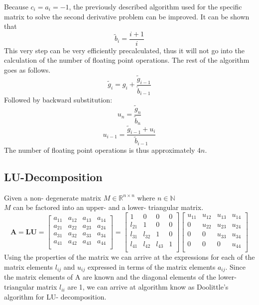 \documentclass[10pt,a4paper]{article}
\begin{document}
Because $c_i=a_i=-1$, the previously described algorithm used for the specific matrix  to solve the second derivative problem can be improved. It can be shown that 
$$\tilde{b}_i=\frac{i+1}{i}$$
This very step can be very efficiently precalculated, thus it will not go into the calculation of the number of floating point operations. The rest of the algorithm goes as follows.
$$\tilde{g}_i=g_i+\frac{\tilde{g}_{i-1}}{\tilde{b}_{i-1}} $$
Followed by backward substitution:
$$u_n = \frac{\tilde{g}_n}{\tilde{b}_n}$$
$$u_{i-1} = \frac{\tilde{g}_{i-1}+u_i}{\tilde{b}_{i-1}}$$
The number of floating point operations is thus approximately $4n$.\\

\subsection{LU-Decomposition}
Given a non- degenerate matrix $ M \in \mathbb{R} ^{n\times n}  $ where $n \in \mathbb{N}$\\$M$ can be factored into an upper- and a lower- triangular matrix.
$$
\textbf{A} =\textbf{LU} =
\begin{bmatrix}
a_{11} & a_{12} & a_{13} & a_{14} \\
a_{21} & a_{22} & a_{23} & a_{24} \\
a_{31} & a_{32} & a_{33} & a_{34} \\
a_{41} & a_{42} & a_{43} & a_{44} \\
\end{bmatrix}=
\begin{bmatrix}
1 & 0 & 0 & 0 \\
l_{21} & 1 & 0 & 0 \\
l_{31} & l_{32} & 1 & 0 \\
l_{41} & l_{42} & l_{43} & 1 \\
\end{bmatrix}
\begin{bmatrix}
u_{11} & u_{12} & u_{13} & u_{14} \\
0 & u_{22} & u_{23} & u_{24} \\
0 & 0 & u_{33} & u_{34} \\
0 & 0 & 0 & u_{44} \\
\end{bmatrix}
$$
Using the properties of the matrix we can arrive at the expressions for each of the matrix elements $l_{ij}$ and  $u_{ij}$ expressed in terms of the matrix elements $a_{ij}$. Since the matrix elements of A are known and the diagonal elements of the lower- triangular matrix $l_{ii}$ are 1, we can arrive at algorithm know as Doolittle's algorithm for LU- decomposition.\\\\
\end{document}

